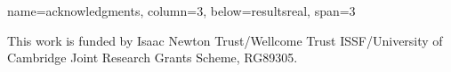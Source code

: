 \documentclass[a0paper,portrait,fontscale=0.35]{baposter}
\theoremstyle{plain}
\theoremstyle{plain}
\theoremstyle{definition}
\theoremstyle{plain}
\theoremstyle{definition}
\begin{document}
\begin{poster}
{name=acknowledgments, column=3, below=resultsreal, span=3}
{  
  \scriptsize
  This work is funded by 
  Isaac Newton Trust/Wellcome Trust ISSF/University of Cambridge 
  Joint Research Grants Scheme, RG89305.
  \par
}






\end{poster}
\end{document}
